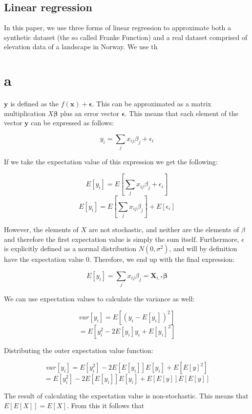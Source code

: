 \documentclass{article}
\begin{document}
\subsection{Linear regression}

In this paper, we use three forms of linear regression to approximate both a synthetic dataset (the so called Franke Function) and a real dataset comprised of elevation data of a landscape in Norway. We use th

\section*{a}

$\bm{y}$ is defined as the $f(\bm{x}) + \bm{\epsilon}$. This can be approximated as a matrix multiplication $X\bm{\beta}$
plus an error vector $\bm{\epsilon}$. This means that each element of the vector
$\bm{y}$ can be expressed as follows:

\[ y_i = \sum_j x_{ij}\beta_j + \epsilon_i \]

If we take the expectation value of this expression we get the following:

\[ E[y_i] = E\left[\sum_j x_{ij}\beta_j + \epsilon_i\right] \]
\[ E[y_i] = E\left[\sum_j x_{ij}\beta_j\right] + E[\epsilon_i] \]

However, the elements of $X$ are not stochastic, and neither are the elements of $\beta$
and therefore
the first expectation value is simply the sum itself. Furthermore, $\epsilon$ is 
explicitly defined as a normal distribution $N(0,\sigma^2)$, and will by definition have
the expectation value $0$. Therefore, we end up with the final expression:

\[ E[y_i] = \sum_j x_{ij}\beta_j = \bm{X}_{i,*}\bm{\beta}\]

We can use expectation values to calculate the variance as well:

\[ var[y_i] = E\left[(y_i - E[y_i])^2\right] \]
\[ = E\left[y_i^2 - 2E[y_i]y_i + E[y_i]^2\right] \]

Distributing the outer expectation value function:

\[ var[y_i] = E[y_i^2] - 2E\left[E[y_i]\right]E[y_i] + E\left[E[y]^2\right] \]
\[ = E[y_i^2] - 2E\left[E[y_i]\right]E[y_i] + E\left[E[y]\right]E\left[E[y]\right] \]

The result of calculating the expectation value is non-stochastic. This means that
$E[E[X]] = E[X]$. From this it follows that
\end{document}
